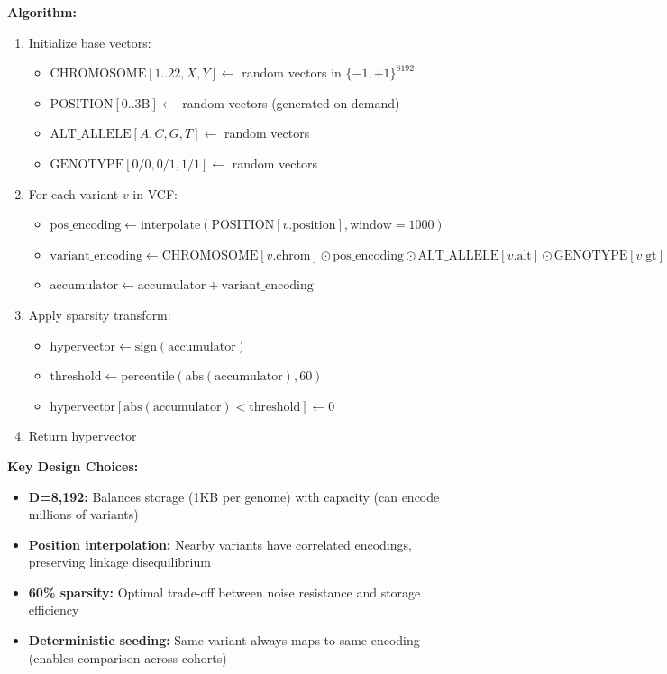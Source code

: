 \documentclass[11pt,a4paper]{article}
\begin{document}
\textbf{Algorithm:}
\begin{enumerate}
    \item Initialize base vectors:
    \begin{itemize}
        \item $\text{CHROMOSOME}[1..22,X,Y] \leftarrow$ random vectors in $\{-1,+1\}^{8192}$
        \item $\text{POSITION}[0..3\text{B}] \leftarrow$ random vectors (generated on-demand)
        \item $\text{ALT\_ALLELE}[A,C,G,T] \leftarrow$ random vectors
        \item $\text{GENOTYPE}[0/0, 0/1, 1/1] \leftarrow$ random vectors
    \end{itemize}

    \item For each variant $v$ in VCF:
    \begin{itemize}
        \item $\text{pos\_encoding} \leftarrow \text{interpolate}(\text{POSITION}[v.\text{position}], \text{window}=1000)$
        \item $\text{variant\_encoding} \leftarrow \text{CHROMOSOME}[v.\text{chrom}] \odot \text{pos\_encoding} \odot \text{ALT\_ALLELE}[v.\text{alt}] \odot \text{GENOTYPE}[v.\text{gt}]$
        \item $\text{accumulator} \leftarrow \text{accumulator} + \text{variant\_encoding}$
    \end{itemize}

    \item Apply sparsity transform:
    \begin{itemize}
        \item $\text{hypervector} \leftarrow \text{sign}(\text{accumulator})$
        \item $\text{threshold} \leftarrow \text{percentile}(\text{abs}(\text{accumulator}), 60)$
        \item $\text{hypervector}[\text{abs}(\text{accumulator}) < \text{threshold}] \leftarrow 0$
    \end{itemize}

    \item Return hypervector
\end{enumerate}

\textbf{Key Design Choices:}
\begin{itemize}
    \item \textbf{D=8,192:} Balances storage (1KB per genome) with capacity (can encode millions of variants)
    \item \textbf{Position interpolation:} Nearby variants have correlated encodings, preserving linkage disequilibrium
    \item \textbf{60\% sparsity:} Optimal trade-off between noise resistance and storage efficiency
    \item \textbf{Deterministic seeding:} Same variant always maps to same encoding (enables comparison across cohorts)
\end{itemize}
\end{document}
